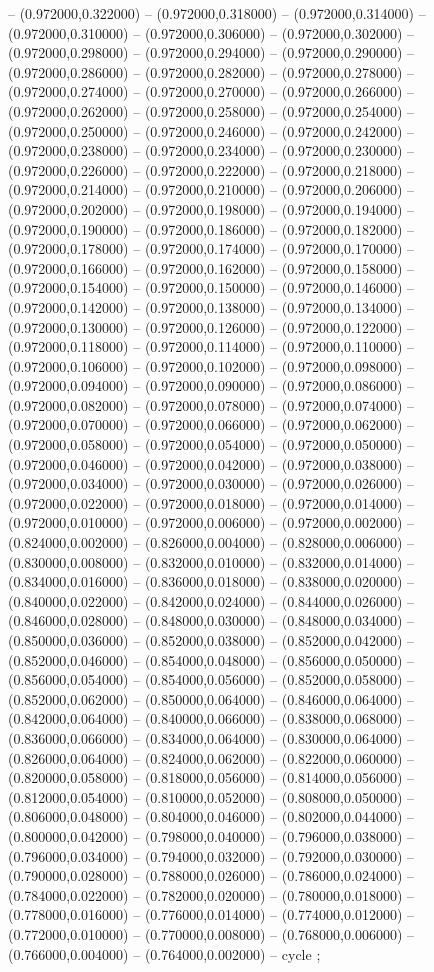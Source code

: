 -- (0.972000,0.322000) -- (0.972000,0.318000) -- (0.972000,0.314000) -- (0.972000,0.310000) -- (0.972000,0.306000) -- (0.972000,0.302000) -- (0.972000,0.298000) -- (0.972000,0.294000) -- (0.972000,0.290000) -- (0.972000,0.286000) -- (0.972000,0.282000) -- (0.972000,0.278000) -- (0.972000,0.274000) -- (0.972000,0.270000) -- (0.972000,0.266000) -- (0.972000,0.262000) -- (0.972000,0.258000) -- (0.972000,0.254000) -- (0.972000,0.250000) -- (0.972000,0.246000) -- (0.972000,0.242000) -- (0.972000,0.238000) -- (0.972000,0.234000) -- (0.972000,0.230000) -- (0.972000,0.226000) -- (0.972000,0.222000) -- (0.972000,0.218000) -- (0.972000,0.214000) -- (0.972000,0.210000) -- (0.972000,0.206000) -- (0.972000,0.202000) -- (0.972000,0.198000) -- (0.972000,0.194000) -- (0.972000,0.190000) -- (0.972000,0.186000) -- (0.972000,0.182000) -- (0.972000,0.178000) -- (0.972000,0.174000) -- (0.972000,0.170000) -- (0.972000,0.166000) -- (0.972000,0.162000) -- (0.972000,0.158000) -- (0.972000,0.154000) -- (0.972000,0.150000) -- (0.972000,0.146000) -- (0.972000,0.142000) -- (0.972000,0.138000) -- (0.972000,0.134000) -- (0.972000,0.130000) -- (0.972000,0.126000) -- (0.972000,0.122000) -- (0.972000,0.118000) -- (0.972000,0.114000) -- (0.972000,0.110000) -- (0.972000,0.106000) -- (0.972000,0.102000) -- (0.972000,0.098000) -- (0.972000,0.094000) -- (0.972000,0.090000) -- (0.972000,0.086000) -- (0.972000,0.082000) -- (0.972000,0.078000) -- (0.972000,0.074000) -- (0.972000,0.070000) -- (0.972000,0.066000) -- (0.972000,0.062000) -- (0.972000,0.058000) -- (0.972000,0.054000) -- (0.972000,0.050000) -- (0.972000,0.046000) -- (0.972000,0.042000) -- (0.972000,0.038000) -- (0.972000,0.034000) -- (0.972000,0.030000) -- (0.972000,0.026000) -- (0.972000,0.022000) -- (0.972000,0.018000) -- (0.972000,0.014000) -- (0.972000,0.010000) -- (0.972000,0.006000) -- (0.972000,0.002000) -- (0.824000,0.002000) -- (0.826000,0.004000) -- (0.828000,0.006000) -- (0.830000,0.008000) -- (0.832000,0.010000) -- (0.832000,0.014000) -- (0.834000,0.016000) -- (0.836000,0.018000) -- (0.838000,0.020000) -- (0.840000,0.022000) -- (0.842000,0.024000) -- (0.844000,0.026000) -- (0.846000,0.028000) -- (0.848000,0.030000) -- (0.848000,0.034000) -- (0.850000,0.036000) -- (0.852000,0.038000) -- (0.852000,0.042000) -- (0.852000,0.046000) -- (0.854000,0.048000) -- (0.856000,0.050000) -- (0.856000,0.054000) -- (0.854000,0.056000) -- (0.852000,0.058000) -- (0.852000,0.062000) -- (0.850000,0.064000) -- (0.846000,0.064000) -- (0.842000,0.064000) -- (0.840000,0.066000) -- (0.838000,0.068000) -- (0.836000,0.066000) -- (0.834000,0.064000) -- (0.830000,0.064000) -- (0.826000,0.064000) -- (0.824000,0.062000) -- (0.822000,0.060000) -- (0.820000,0.058000) -- (0.818000,0.056000) -- (0.814000,0.056000) -- (0.812000,0.054000) -- (0.810000,0.052000) -- (0.808000,0.050000) -- (0.806000,0.048000) -- (0.804000,0.046000) -- (0.802000,0.044000) -- (0.800000,0.042000) -- (0.798000,0.040000) -- (0.796000,0.038000) -- (0.796000,0.034000) -- (0.794000,0.032000) -- (0.792000,0.030000) -- (0.790000,0.028000) -- (0.788000,0.026000) -- (0.786000,0.024000) -- (0.784000,0.022000) -- (0.782000,0.020000) -- (0.780000,0.018000) -- (0.778000,0.016000) -- (0.776000,0.014000) -- (0.774000,0.012000) -- (0.772000,0.010000) -- (0.770000,0.008000) -- (0.768000,0.006000) -- (0.766000,0.004000) -- (0.764000,0.002000) -- cycle
   ;
